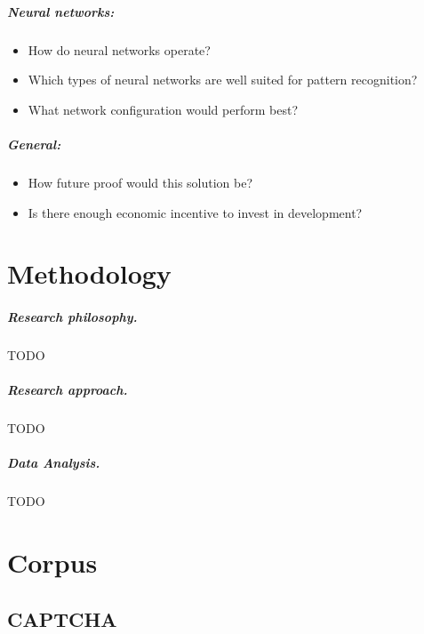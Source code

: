 \documentclass[pdftex,a4paper,12pt,twoside]{report}
\theoremstyle{plain} \newtheorem{theorem}{Theorem} \newtheorem{proposition}{Proposition} \newtheorem{lemma}{Lemma} \newtheorem*{corollary}{Corollary}
\theoremstyle{definition} \newtheorem{definition}{Definition} \newtheorem{conjecture}{Conjecture} \newtheorem*{example}{Example} \newtheorem{algorithm}{Algorithm}
\theoremstyle{remark} \newtheorem*{remark}{Remark} \newtheorem*{note}{Note} \newtheorem{case}{Case}
\begin{document}
\paragraph{Neural networks:}
\begin{itemize}
\item How do neural networks operate?
\item Which types of neural networks are well suited for pattern recognition?
\item What network configuration would perform best?
\end{itemize}
\paragraph{General:}
\begin{itemize}
\item How future proof would this solution be?
\item Is there enough economic incentive to invest in development?
\end{itemize}
\chapter{Methodology}
\label{ch:methodology}
\paragraph{Research philosophy.}
TODO
\paragraph{Research approach.}
TODO
\paragraph{Data Analysis.}
TODO
\chapter{Corpus}
\label{ch:corpus}
\section{CAPTCHA}
\label{sec:captcha}
\end{document}
